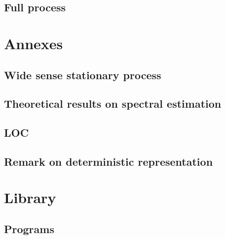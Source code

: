 \documentclass[a4paper, 12pt]{report}
\begin{document}
\chapter{Full process}
\label{chap:fullprocess}


\part{Annexes}
\chapter{Wide sense stationary process}
\label{ann:wss}

\chapter{Theoretical results on spectral estimation}
\label{ann:spectral-estimation}
 
\chapter{LOC}
 
\chapter{Remark on deterministic representation}
 

\part{Library}
 \def\programs{../../allprogs/}
 \def\programsfullprocess{fullprocess/}
 \def\programsToolbox{fullprocess/ZZtoolbox/}
 \def\programspierrick{fullprocess/ZZtoolbox/00Pierrick/}
\chapter{Programs}
\end{document}
